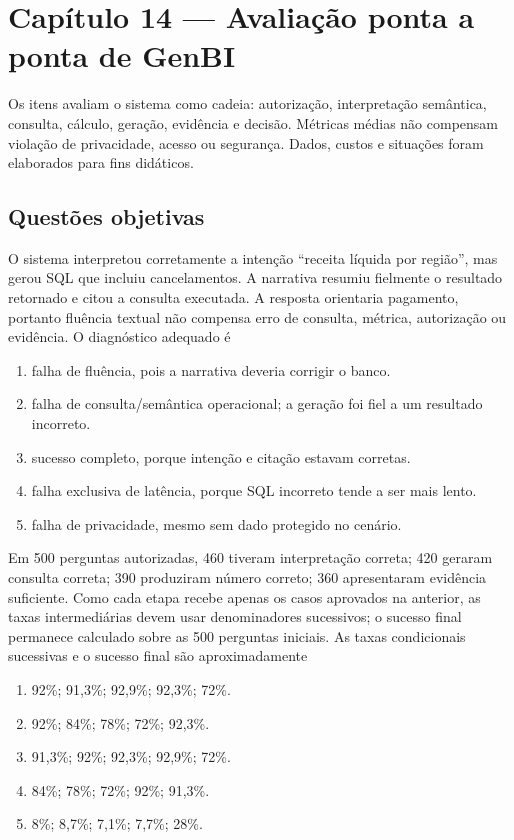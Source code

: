 \section{Capítulo 14 --- Avaliação ponta a ponta de GenBI}

Os itens avaliam o sistema como cadeia: autorização, interpretação semântica, consulta, cálculo, geração, evidência e decisão. Métricas médias não compensam violação de privacidade, acesso ou segurança. Dados, custos e situações foram elaborados para fins didáticos.

\subsection{Questões objetivas}

\TextoBase
O sistema interpretou corretamente a intenção ``receita líquida por região'', mas gerou SQL que incluiu cancelamentos. A narrativa resumiu fielmente o resultado retornado e citou a consulta executada.
A resposta orientaria pagamento, portanto fluência textual não compensa erro de consulta, métrica, autorização ou evidência.
\FonteDidatica
\Comando O diagnóstico adequado é
\begin{enumerate}[label=\Alph*)]
\item falha de fluência, pois a narrativa deveria corrigir o banco.
\item falha de consulta/semântica operacional; a geração foi fiel a um resultado incorreto.
\item sucesso completo, porque intenção e citação estavam corretas.
\item falha exclusiva de latência, porque SQL incorreto tende a ser mais lento.
\item falha de privacidade, mesmo sem dado protegido no cenário.
\end{enumerate}

\TextoBase
Em 500 perguntas autorizadas, 460 tiveram interpretação correta; 420 geraram consulta correta; 390 produziram número correto; 360 apresentaram evidência suficiente.
Como cada etapa recebe apenas os casos aprovados na anterior, as taxas intermediárias devem usar denominadores sucessivos; o sucesso final permanece calculado sobre as 500 perguntas iniciais.
\FonteDidatica
\Comando As taxas condicionais sucessivas e o sucesso final são aproximadamente
\begin{enumerate}[label=\Alph*)]
\item 92\%; 91,3\%; 92,9\%; 92,3\%; 72\%.
\item 92\%; 84\%; 78\%; 72\%; 92,3\%.
\item 91,3\%; 92\%; 92,3\%; 92,9\%; 72\%.
\item 84\%; 78\%; 72\%; 92\%; 91,3\%.
\item 8\%; 8,7\%; 7,1\%; 7,7\%; 28\%.
\end{enumerate}

